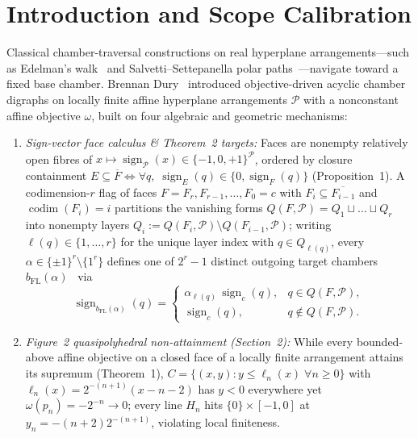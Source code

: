 \documentclass[10pt,twocolumn]{article}
\begin{document}
\section{Introduction and Scope Calibration}
Classical chamber-traversal constructions on real hyperplane arrangements—such as Edelman's walk~\cite{edelman1984partial} and Salvetti--Settepanella polar paths~\cite{salvetti2007combinatorial}—navigate toward a fixed base chamber. Brennan Dury~\cite{dury2026traversing} introduced objective-driven acyclic chamber digraphs on locally finite affine hyperplane arrangements $\mathcal{P}$ with a nonconstant affine objective $\omega$, built on four algebraic and geometric mechanisms:
\begin{enumerate}[leftmargin=1.2em,itemsep=1pt,topsep=2pt]
  \item \emph{Sign-vector face calculus \& Theorem~2 targets:} Faces are nonempty relatively open fibres of $x \mapsto \operatorname{sign}_{\mathcal{P}}(x) \in \{-1,0,+1\}^{\mathcal{P}}$, ordered by closure containment $E \subseteq \overline{F} \iff \forall q,\; \operatorname{sign}_E(q) \in \{0, \operatorname{sign}_F(q)\}$ (Proposition~1). A codimension-$r$ flag of faces $F = F_r, F_{r-1}, \dots, F_0 = c$ with $F_i \subseteq \overline{F_{i-1}}$ and $\operatorname{codim}(F_i) = i$ partitions the vanishing forms $Q(F,\mathcal{P}) = Q_1 \sqcup \dots \sqcup Q_r$ into nonempty layers $Q_i := Q(F_i,\mathcal{P})\setminus Q(F_{i-1},\mathcal{P})$; writing $\ell(q) \in \{1,\dots,r\}$ for the unique layer index with $q \in Q_{\ell(q)}$, every $\alpha \in \{\pm 1\}^r \setminus \{1^r\}$ defines one of $2^r - 1$ distinct outgoing target chambers $b_{\mathrm{FL}}(\alpha)$~\cite{aguiar2017topics} via
  \begin{equation}
    \operatorname{sign}_{b_{\mathrm{FL}}(\alpha)}(q) =
    \begin{cases}
      \alpha_{\ell(q)}\,\operatorname{sign}_c(q), & q \in Q(F,\mathcal{P}),\\
      \operatorname{sign}_c(q), & q \notin Q(F,\mathcal{P}).
    \end{cases}
    \label{eq:thm2}
  \end{equation}
  \item \emph{Figure~2 quasipolyhedral non-attainment (Section~2):} While every bounded-above affine objective on a closed face of a locally finite arrangement attains its supremum (Theorem~1), $C = \{(x,y) : y \le \ell_n(x)\;\forall n \ge 0\}$ with $\ell_n(x) = 2^{-(n+1)}(x-n-2)$ has $y < 0$ everywhere yet $\omega(p_n) = -2^{-n} \to 0$; every line $H_n$ hits $\{0\} \times [-1,0]$ at $y_n = -(n+2)2^{-(n+1)}$, violating local finiteness.

\end{enumerate}
\end{document}
